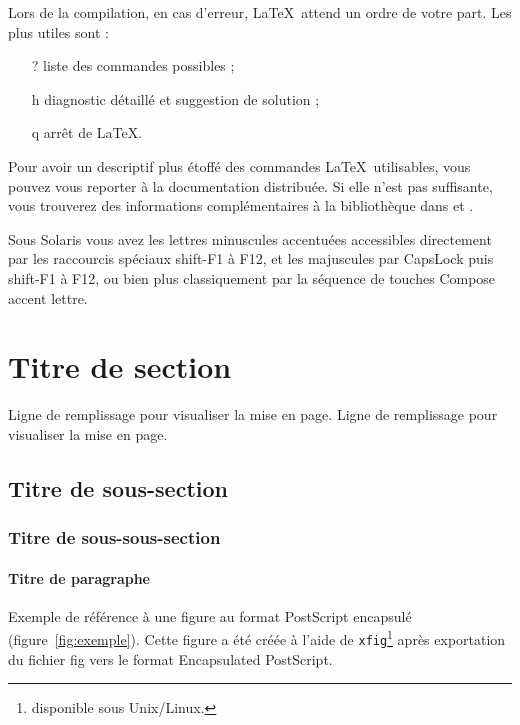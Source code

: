 \documentclass[a4paper,11pt]{article}
\begin{document}
Lors de la compilation, en cas d'erreur, \LaTeX\ attend un ordre de
votre part. Les plus utiles sont :
\begin{itemize}
        \item[?] liste des commandes possibles ;

        \item[h] diagnostic détaillé et suggestion de solution ; 
 
        \item[q] arrêt de \LaTeX.
\end{itemize}

Pour avoir un descriptif plus étoffé des commandes \LaTeX\ 
utilisables, vous pouvez vous reporter à la documentation distribuée.
Si elle n'est pas suffisante, vous trouverez des informations
complémentaires à la bibliothèque dans \cite{lamport:latex:94} et
\cite{rolland:latex:95}.

Sous Solaris vous avez les lettres minuscules accentuées
accessibles directement par les raccourcis spéciaux \textsf{shift-F1 à F12}, 
et les majuscules par \textsf{CapsLock} puis \textsf{shift-F1 à F12}, 
ou bien plus classiquement par la séquence de touches 
\textsf{Compose accent lettre}.



\section{Titre de section}  

Ligne de remplissage pour visualiser la mise en page. Ligne de
remplissage pour visualiser la mise en page. 

\subsection{Titre de sous-section}
\subsubsection{Titre de sous-sous-section}
\paragraph{Titre de paragraphe}

Exemple de référence à une figure au format PostScript encapsulé
(figure~\ref{fig:exemple}). Cette figure a été créée à l'aide de
\texttt{xfig}\footnote{disponible sous Unix/Linux.} après exportation 
du fichier fig vers le format Encapsulated PostScript.
\end{document}
